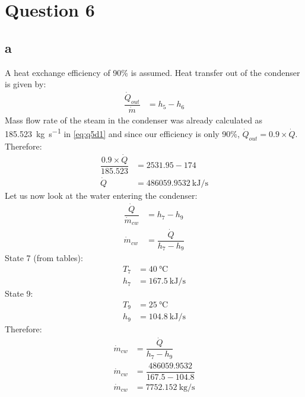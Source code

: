 \documentclass[11pt]{article}
\numberwithin{equation}{section}
\begin{document}
\section{Question 6}
\subsection{a}
A heat exchange efficiency of 90\% is assumed. Heat transfer out of the condenser is given by:
\begin{align}
    \dfrac{\dot{Q}_{out}}{\dot{m}} &= h_5 - h_6
\end{align}
Mass flow rate of the steam in the condenser was already calculated as \SI{185.523}{\kg\per\s} in \ref{eq:q5d1} and since our efficiency is only 90\%, $\dot{Q}_{out} =0.9\times \dot{Q}$. Therefore:
\begin{align}
    \dfrac{0.9\times\dot{Q}}{185.523} &= 2531.95 - 174\\
    \dot{Q} &= \SI{486059.9532}{\kilo\joule\per\second}
\end{align}
Let us now look at the water entering the condenser:
\begin{align}
    \dfrac{\dot{Q}}{\dot{m}_{cw}} &= h_7 - h_9\\
    \dot{m}_{cw} &= \dfrac{\dot{Q}}{h_7 - h_9}
\end{align}
State 7 (from tables):
\begin{align}
    T_7 &= \SI{40}{\celsius}\\
    h_7 &= \SI{167.5}{\kilo\joule\per\second}
\end{align}
State 9:
\begin{align}
    T_9 &= \SI{25}{\celsius}\\
    h_9 &= \SI{104.8}{\kilo\joule\per\second}
\end{align}
Therefore:
\begin{align}
    \dot{m}_{cw} &= \dfrac{\dot{Q}}{h_7 - h_9}\\
    \dot{m}_{cw} &= \dfrac{486059.9532}{167.5 - 104.8}\\
    \dot{m}_{cw} &= \SI{7752.152}{\kg\per\second} \label{eq:q6b1}
\end{align}
\end{document}
